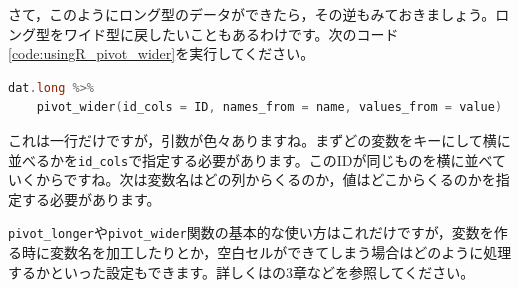 \documentclass{ltjsbook}
\begin{document}
さて，このようにロング型のデータができたら，その逆もみておきましょう。ロング型をワイド型に戻したいこともあるわけです。次のコード\ref{code:usingR_pivot_wider}を実行してください。
\begin{lstlisting}[language=c++,label={code:usingR_pivot_wider},caption={ワイド型にする関数}]
dat.long %>% 
    pivot_wider(id_cols = ID, names_from = name, values_from = value)
\end{lstlisting}
これは一行だけですが，引数が色々ありますね。まずどの変数をキーにして横に並べるかを\verb|id_cols|で指定する必要があります。このIDが同じものを横に並べていくからですね。次は変数名はどの列からくるのか，値はどこからくるのかを指定する必要があります。

\verb|pivot_longer|や\verb|pivot_wider|関数の基本的な使い方はこれだけですが，変数を作る時に変数名を加工したりとか，空白セルができてしまう場合はどのように処理するかといった設定もできます。詳しくは\textcite{Kinosady2021}の3章などを参照してください。
\end{document}
